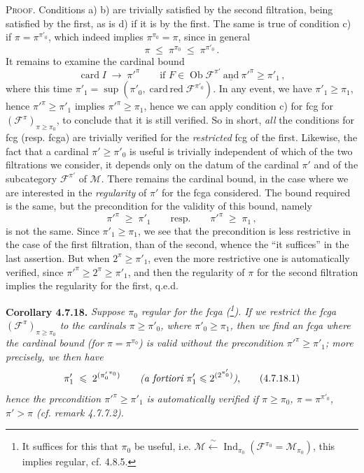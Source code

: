 \documentclass[11pt]{article}
\newcommand{\printedpage}[1]{\marginpar{\footnotesize p.~#1}}
\newcommand{\msp}[1]{\marginpar{\footnotesize [#1]}}
\newcommand{\Ob}{\operatorname{Ob}}
\newcommand{\Ind}{\operatorname{Ind}}
\newcommand{\card}{\operatorname{card}}
\newcommand{\cardred}{\operatorname{card\,red}}
\begin{document}
\textsc{Proof}. Conditions a) b) are trivially satisfied by the second filtration, being satisfied by the first, as is d) if it is by the first. The same is true of condition c) if $\pi=\pi^{\pi'_0}$, which indeed implies $\pi^{\pi_0}=\pi$, since in general
\[
\pi \;\leqslant\; \pi^{\pi_0} \;\leqslant\; \pi^{\pi'_0} \, .
\]
It remains to examine the cardinal bound
\[
\card I \;\longrightarrow\; \pi'^{\pi} \qquad \text{if } F\in\Ob\mathcal{F}^{\pi'} \ \underline{\text{and}}\ \pi'^{\pi}\geqslant\pi'_1 \, , %
\]
where this time $\pi'_1=\sup(\pi'_0,\cardred\mathcal{F}^{\pi'_0})$. In any event, we have $\pi'_1\geqslant\pi_1$, hence
\msp{page 183}
$\pi'^{\pi}\geqslant\pi'_1$ implies $\pi'^{\pi}\geqslant\pi_1$, hence we can apply condition c) for fcg for $(\mathcal{F}^{\pi})_{\pi\geqslant\pi_0}$, to conclude that it is still verified. So in short, \textit{all} the conditions for fcg (resp. fcga) are trivially verified for the \textit{restricted} fcg of the first. Likewise, the fact that a cardinal $\pi'\geqslant\pi'_0$ is useful is trivially independent of which of the two filtrations we consider, it depends only on the datum of the cardinal $\pi'$ and of the subcategory $\mathcal{F}^{\pi'}$ of $\mathcal{M}$. There remains the cardinal bound, in the case where we are interested in the \textit{regularity} of $\pi'$ for the fcga considered. The bound required is the same, but the precondition for the validity of this bound, namely
\[
\pi'^{\pi} \;\geqslant\; \pi'_1 \qquad \text{resp.} \qquad \pi'^{\pi} \;\geqslant\; \pi_1 \, ,
\]
is not the same. Since $\pi'_1\geqslant\pi_1$, we see that the precondition is less restrictive in the case of the first filtration, than of the second, whence the ``it suffices'' in the last assertion. But when $2^{\pi}\geqslant\pi'_1$, even the more restrictive one is automatic\msp{page 184}ally verified, since $\pi'^{\pi}\geqslant 2^{\pi}\geqslant\pi'_1$, and then the regularity of $\pi$ for the second filtration implies the regularity for the first, q.e.d. %

\noindent\printedpage{63}
\textbf{Corollary 4.7.18.} \textit{Suppose $\pi_0$ regular for the fcga (\footnote[77]{It suffices for this that $\pi_0$ be useful, i.e. $\mathcal{M}\xleftarrow{\ \sim\ }\Ind_{\pi_0}(\mathcal{F}^{\pi_0}=\mathcal{M}_{\pi_0})$, this implies regular, cf. 4.8.5.}). If we restrict the fcga $(\mathcal{F}^{\pi})_{\pi\geqslant\pi_0}$ to the cardinals $\pi\geqslant\pi'_0$, where $\pi'_0\geqslant\pi_1$, then we find an fcga where the cardinal bound (for $\pi=\pi^{\pi_0}$) is valid without the precondition $\pi'^{\pi}\geqslant\pi'_1$; more precisely, we then have}
\[
\pi'_1 \;\leqslant\; 2^{({\pi'_0}^{\pi_0})} \qquad \text{\textit{(a fortiori $\pi'_1\leqslant 2^{(2^{\pi'_0})}$)},} \tag*{(4.7.18.1)}
\]
\textit{hence the precondition $\pi'^{\pi}\geqslant\pi'_1$ is automatically verified if $\pi\geqslant\pi_0$, $\pi=\pi^{\pi'_0}$, $\pi'>\pi$ (cf. remark 4.7.7.2).}
\end{document}
